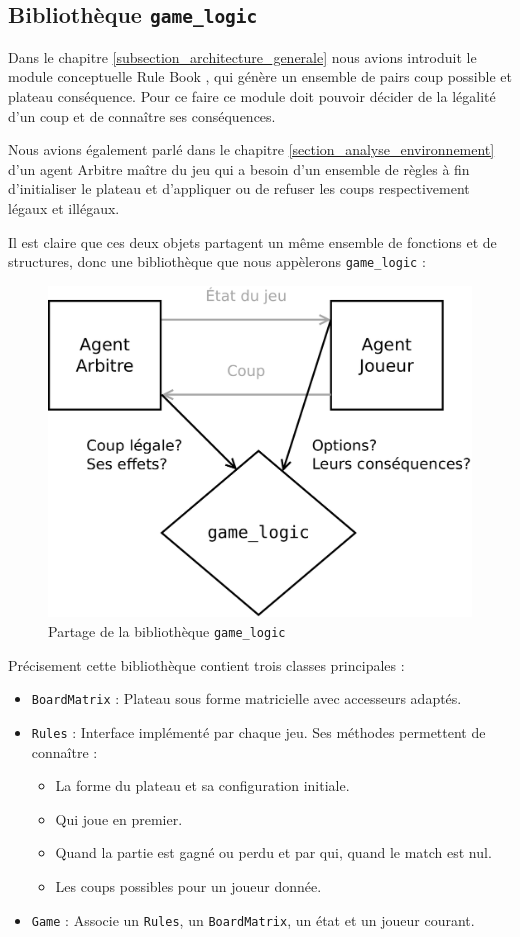 \subsection{Bibliothèque \texttt{\gls{game_logic}}}
Dans le chapitre \ref{subsection_architecture_generale} nous avions introduit le module conceptuelle \og Rule Book \fg{}, qui génère un ensemble de pairs coup possible et plateau conséquence. Pour ce faire ce module doit pouvoir décider de la légalité d'un coup et de connaître ses conséquences. 

Nous avions également parlé dans le chapitre \ref{section_analyse_environnement} d'un agent \og Arbitre \fg{} maître du jeu qui a besoin d'un ensemble de règles à fin d'initialiser le plateau et d'appliquer ou de refuser les coups respectivement légaux et illégaux.

Il est claire que ces deux objets partagent un même ensemble de fonctions et de structures, donc une bibliothèque que nous appèlerons \texttt{game\_logic}  :
\begin{figure}[H] 
\centering
\includegraphics[width=\textwidth]{files/env/game_logic_shared} 
\caption{Partage de la bibliothèque \texttt{game\_logic}} 
\label{game_logic_shared}
\end{figure}
Précisement cette bibliothèque contient trois classes principales :
\begin{itemize}
\item \texttt{BoardMatrix} : Plateau sous forme matricielle avec accesseurs adaptés.
\item \texttt{Rules} : Interface implémenté par chaque jeu. Ses méthodes permettent de connaître :
\begin{itemize}
\item La forme du plateau et sa configuration initiale.
\item Qui joue en premier.
\item Quand la partie est gagné ou perdu et par qui, quand le match est nul.
\item Les coups possibles pour un joueur donnée.
\end{itemize}
\item \texttt{Game} : Associe un \texttt{Rules}, un \texttt{BoardMatrix}, un état et un joueur courant.
\end{itemize}
